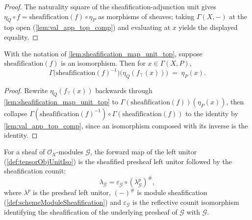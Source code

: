 \begin{proof}


  The naturality square of the sheafification-adjunction unit gives
  \(\eta_Q \circ f = \mathrm{sheafification}(f) \circ \eta_P\) as morphisms of
  sheaves; taking \(\Gamma(X,-)\) at the top open (\cref{lem:val_app_top_comp})
  and evaluating at \(x\) yields the displayed equality.
\end{proof}

\begin{lemma}
  \label{lem:sheafification_map_unit_top_inv}
  With the notation of \cref{lem:sheafification_map_unit_top}, suppose
  \(\mathrm{sheafification}(f)\) is an isomorphism. Then for \(x \in \Gamma(X,P)\),
  \[
    \Gamma\bigl(\mathrm{sheafification}(f)^{-1}\bigr)
      \bigl(\eta_Q(f_{\top}(x))\bigr) \;=\; \eta_P(x).
  \]
\end{lemma}

\begin{proof}


  Rewrite \(\eta_Q(f_{\top}(x))\) backwards through
  \cref{lem:sheafification_map_unit_top} to
  \(\Gamma(\mathrm{sheafification}(f))(\eta_P(x))\), then collapse
  \(\Gamma(\mathrm{sheafification}(f)^{-1}) \circ \Gamma(\mathrm{sheafification}(f))\)
  to the identity by \cref{lem:val_app_top_comp}, since an isomorphism composed with its inverse
  is the identity.
\end{proof}

\begin{lemma}
  \label{lem:tensorObjUnitIso_hom}
  For a sheaf of \(\mathcal{O}_X\)-modules \(\mathcal{G}\), the forward map of the
  left unitor (\cref{def:tensorObjUnitIso}) is the sheafified presheaf left unitor
  followed by the sheafification counit:
  \[
    \lambda_{\mathcal{G}}
      = \varepsilon_{\mathcal{G}} \circ (\lambda^p_{\mathcal{G}})^{\#},
  \]
  where \(\lambda^p\) is the presheaf left unitor, \((-)^{\#}\) is module
  sheafification (\cref{def:schemeModuleSheafification}) and
  \(\varepsilon_{\mathcal{G}}\) is the reflective counit isomorphism identifying
  the sheafification of the underlying presheaf of \(\mathcal{G}\) with
  \(\mathcal{G}\).
\end{lemma}

